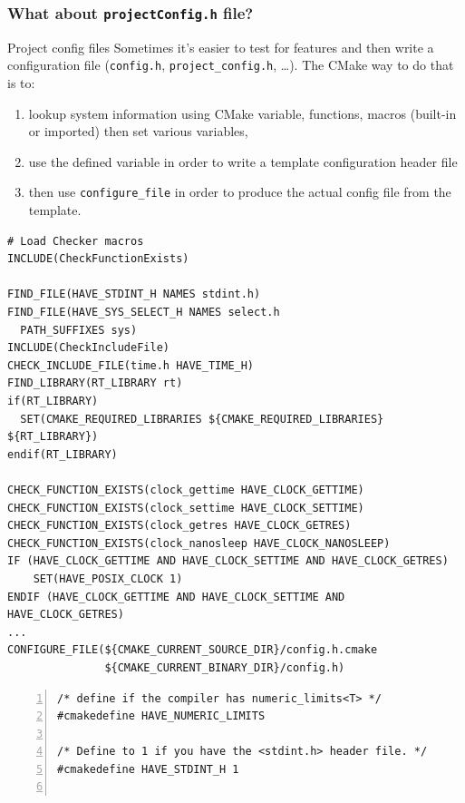 \documentclass[compress,slidestop,table,usepdftitle=false
              ]
               {beamer}
\newcommand{\fname}[1]{\texttt{#1}}
\begin{document}
\begin{frame}
\frametitle{What about \fname{projectConfig.h} file?}
\begin{block}{Project config files}
Sometimes it's easier to test for features and then write a
configuration file (\fname{config.h}, \fname{project\_config.h}, \ldots).
The CMake way to do that is to:
\vspace*{0.4cm}
\begin{enumerate}
\item lookup system information using CMake variable, functions, macros (built-in or imported)
      then set various variables,
\item use the defined variable in order to write a template configuration
      header file
\item then use \lstinline!configure_file! in order to produce the actual
      config file from the template.
\end{enumerate}
\end{block}

\begin{lstlisting}[basicstyle=\tiny,caption=Excerpt from CERTI project's main \fname{CMakeLists.txt}]
# Load Checker macros
INCLUDE(CheckFunctionExists)

FIND_FILE(HAVE_STDINT_H NAMES stdint.h)
FIND_FILE(HAVE_SYS_SELECT_H NAMES select.h
  PATH_SUFFIXES sys)
INCLUDE(CheckIncludeFile)
CHECK_INCLUDE_FILE(time.h HAVE_TIME_H)
FIND_LIBRARY(RT_LIBRARY rt)
if(RT_LIBRARY)
  SET(CMAKE_REQUIRED_LIBRARIES ${CMAKE_REQUIRED_LIBRARIES} ${RT_LIBRARY})
endif(RT_LIBRARY)

CHECK_FUNCTION_EXISTS(clock_gettime HAVE_CLOCK_GETTIME)
CHECK_FUNCTION_EXISTS(clock_settime HAVE_CLOCK_SETTIME)
CHECK_FUNCTION_EXISTS(clock_getres HAVE_CLOCK_GETRES)
CHECK_FUNCTION_EXISTS(clock_nanosleep HAVE_CLOCK_NANOSLEEP)
IF (HAVE_CLOCK_GETTIME AND HAVE_CLOCK_SETTIME AND HAVE_CLOCK_GETRES)
    SET(HAVE_POSIX_CLOCK 1)
ENDIF (HAVE_CLOCK_GETTIME AND HAVE_CLOCK_SETTIME AND HAVE_CLOCK_GETRES)
...
CONFIGURE_FILE(${CMAKE_CURRENT_SOURCE_DIR}/config.h.cmake
               ${CMAKE_CURRENT_BINARY_DIR}/config.h)
\end{lstlisting}
\begin{Verbatim}[fontsize=\tiny,numbers=left,frame=topline,label=Excerpt from CERTI \fname{config.h.cmake}]
/* define if the compiler has numeric_limits<T> */
#cmakedefine HAVE_NUMERIC_LIMITS

/* Define to 1 if you have the <stdint.h> header file. */
#cmakedefine HAVE_STDINT_H 1


\end{Verbatim}
\end{frame}
\end{document}
